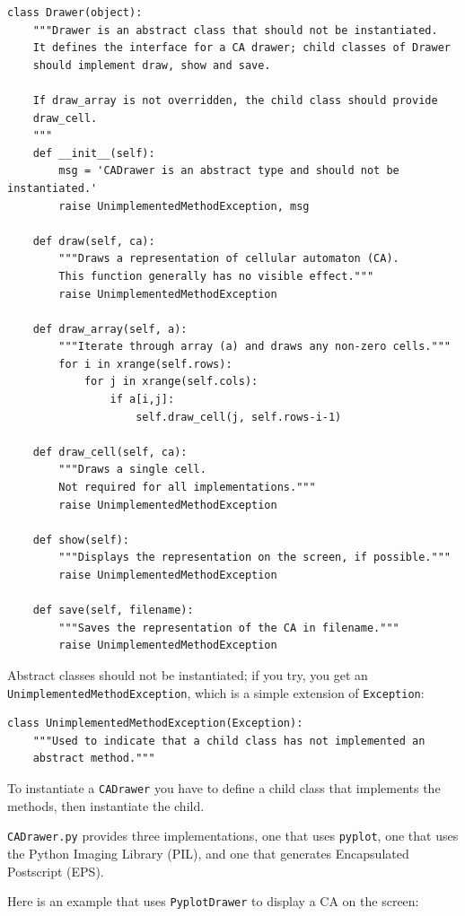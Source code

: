 \documentclass[10pt]{book}
\begin{document}
\begin{verbatim}
class Drawer(object):
    """Drawer is an abstract class that should not be instantiated.
    It defines the interface for a CA drawer; child classes of Drawer
    should implement draw, show and save.

    If draw_array is not overridden, the child class should provide
    draw_cell.
    """
    def __init__(self):
        msg = 'CADrawer is an abstract type and should not be instantiated.'
        raise UnimplementedMethodException, msg

    def draw(self, ca):
        """Draws a representation of cellular automaton (CA).
        This function generally has no visible effect."""
        raise UnimplementedMethodException
    
    def draw_array(self, a):
        """Iterate through array (a) and draws any non-zero cells."""
        for i in xrange(self.rows):
            for j in xrange(self.cols):
                if a[i,j]:
                    self.draw_cell(j, self.rows-i-1)

    def draw_cell(self, ca):
        """Draws a single cell.
        Not required for all implementations."""
        raise UnimplementedMethodException
    
    def show(self):
        """Displays the representation on the screen, if possible."""
        raise UnimplementedMethodException

    def save(self, filename):
        """Saves the representation of the CA in filename."""
        raise UnimplementedMethodException
\end{verbatim}

Abstract classes should not be instantiated; if you try, you
get an {\tt UnimplementedMethodException}, which is a simple
extension of {\tt Exception}:

\begin{verbatim}
class UnimplementedMethodException(Exception):
    """Used to indicate that a child class has not implemented an
    abstract method."""
\end{verbatim}

To instantiate a {\tt CADrawer} you have to define a child class
that implements the methods, then instantiate the child.

{\tt CADrawer.py} provides three implementations, one that uses
{\tt pyplot}, one that uses the Python Imaging Library (PIL), and
one that generates Encapsulated Postscript (EPS).

Here is an example that uses {\tt PyplotDrawer} to display a
CA on the screen:
\end{document}

